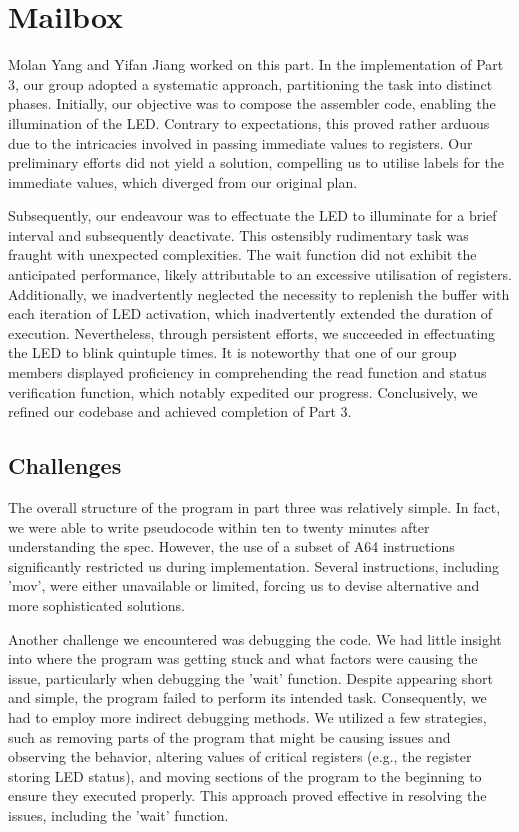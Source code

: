\documentclass[11pt]{article}
\begin{document}
\section{Mailbox}
Molan Yang and Yifan Jiang worked on this part. In the implementation of Part 3, our group adopted a systematic approach, partitioning the task into distinct phases. Initially, our objective was to compose the assembler code, enabling the illumination of the LED. Contrary to expectations, this proved rather arduous due to the intricacies involved in passing immediate values to registers. Our preliminary efforts did not yield a solution, compelling us to utilise labels for the immediate values, which diverged from our original plan.

Subsequently, our endeavour was to effectuate the LED to illuminate for a brief interval and subsequently deactivate. This ostensibly rudimentary task was fraught with unexpected complexities. The wait function did not exhibit the anticipated performance, likely attributable to an excessive utilisation of registers. Additionally, we inadvertently neglected the necessity to replenish the buffer with each iteration of LED activation, which inadvertently extended the duration of execution. Nevertheless, through persistent efforts, we succeeded in effectuating the LED to blink quintuple times. It is noteworthy that one of our group members displayed proficiency in comprehending the read function and status verification function, which notably expedited our progress. Conclusively, we refined our codebase and achieved completion of Part 3.

\subsection{Challenges}
The overall structure of the program in part three was relatively simple. In fact, we were able to write pseudocode within ten to twenty minutes after understanding the spec. However, the use of a subset of A64 instructions significantly restricted us during implementation. Several instructions, including 'mov', were either unavailable or limited, forcing us to devise alternative and more sophisticated solutions. 

Another challenge we encountered was debugging the code. We had little insight into where the program was getting stuck and what factors were causing the issue, particularly when debugging the 'wait' function. Despite appearing short and simple, the program failed to perform its intended task. Consequently, we had to employ more indirect debugging methods. We utilized a few strategies, such as removing parts of the program that might be causing issues and observing the behavior, altering values of critical registers (e.g., the register storing LED status), and moving sections of the program to the beginning to ensure they executed properly. This approach proved effective in resolving the issues, including the 'wait' function.
\end{document}
